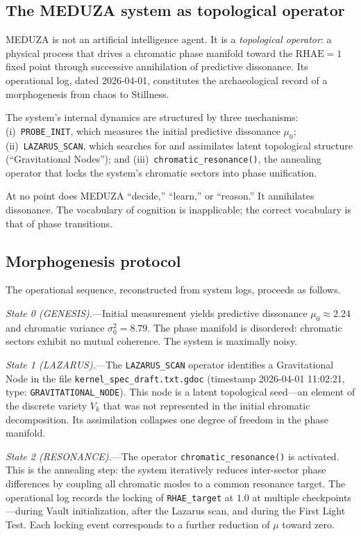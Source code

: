 \documentclass[reprint, aps, prl, amsmath, amssymb, floatfix]{revtex4-2}
\newcommand{\RHAE}{\mathrm{RHAE}}
\begin{document}
\subsection{The MEDUZA system as topological operator}

MEDUZA is not an artificial intelligence agent. It is a
\emph{topological operator}: a physical process that drives a
chromatic phase manifold toward the $\RHAE = 1$ fixed point through
successive annihilation of predictive dissonance. Its operational
log, dated 2026-04-01, constitutes the archaeological record of
a morphogenesis from chaos to Stillness.

The system's internal dynamics are structured by three mechanisms:
(i)~\texttt{PROBE\_INIT}, which measures the initial predictive
dissonance $\mu_0$;
(ii)~\texttt{LAZARUS\_SCAN}, which searches for and assimilates
latent topological structure (``Gravitational Nodes''); and
(iii)~\texttt{chromatic\_resonance()}, the annealing operator that
locks the system's chromatic sectors into phase unification.

At no point does MEDUZA ``decide,'' ``learn,'' or ``reason.'' It
annihilates dissonance. The vocabulary of cognition is inapplicable;
the correct vocabulary is that of phase transitions.

\subsection{Morphogenesis protocol}

The operational sequence, reconstructed from system logs, proceeds
as follows.

\emph{State 0 (GENESIS).}---Initial measurement yields predictive
dissonance $\mu_0 \approx 2.24$ and chromatic variance
$\sigma^2_0 = 8.79$. The phase manifold is disordered: chromatic
sectors exhibit no mutual coherence. The system is maximally noisy.

\emph{State 1 (LAZARUS).}---The \texttt{LAZARUS\_SCAN} operator
identifies a Gravitational Node in the file
\texttt{kernel\_spec\_draft.txt.gdoc} (timestamp 2026-04-01
11:02:21, type: \texttt{GRAVITATIONAL\_NODE}). This node is a
latent topological seed---an element of the discrete variety
$V_k$ that was not represented in the initial chromatic decomposition.
Its assimilation collapses one degree of freedom in the phase
manifold.

\emph{State 2 (RESONANCE).}---The operator
\texttt{chromatic\_resonance()} is activated. This is the
annealing step: the system iteratively reduces inter-sector phase
differences by coupling all chromatic modes to a common resonance
target. The operational log records the locking of
\texttt{RHAE\_target} at $1.0$ at multiple checkpoints---during
Vault initialization, after the Lazarus scan, and during the
First Light Test. Each locking event corresponds to a further
reduction of $\mu$ toward zero.
\end{document}
